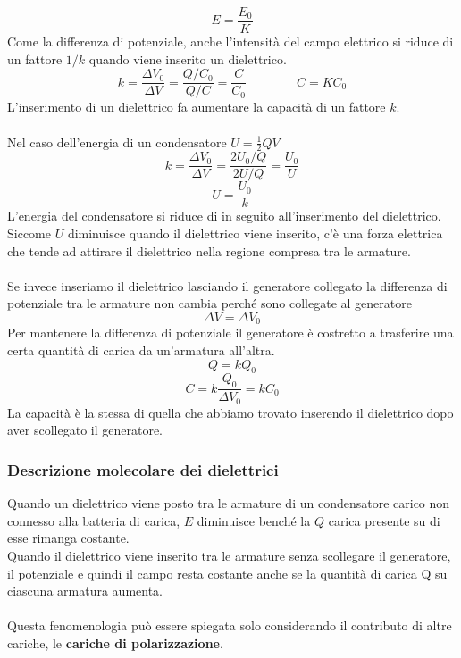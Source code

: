 \documentclass[../main.tex]{subfiles}
\begin{document}
	$$ E = \frac {E _ {0}}{K} $$
	Come la differenza di potenziale, anche l’intensità del campo elettrico si riduce di un fattore $1/k$ quando viene inserito un dielettrico.
	$$ k = \frac {\Delta V _ {0}}{\Delta V} = \frac {Q / C _ {0}}{Q / C} = \frac {C}{C _ {0}} \qquad\qquad C = K C _ {0} $$
	L’inserimento di un dielettrico fa aumentare la capacità di un fattore $k$.\\\\
	Nel caso dell’energia di un condensatore $U = \frac{1}{2} QV$
	$$ k = \frac{\Delta V_0}{\Delta V} = \frac{2 U_0 / Q}{2 U / Q} = \frac{U_0}{U} $$
	$$ U = \frac{U_0}{k} $$
	L’energia del condensatore si riduce di in seguito all’inserimento del dielettrico.\\
	Siccome $U$ diminuisce quando il dielettrico viene inserito, c’è una forza elettrica che tende ad attirare il dielettrico nella regione compresa tra le armature.\\\\
	Se invece inseriamo il dielettrico lasciando il generatore collegato la differenza di potenziale tra le armature non cambia perché sono collegate al generatore
	$$ \Delta V = \Delta V_0 $$
	Per mantenere la differenza di potenziale il generatore è costretto a trasferire una certa quantità di carica da un’armatura all’altra.
	$$ Q = k Q_0 $$
	$$ C = k \frac{Q_0}{\Delta V_0} = k C_0 $$
	La capacità è la stessa di quella che abbiamo trovato inserendo il dielettrico dopo aver scollegato il generatore.
	\subsubsection{Descrizione molecolare dei dielettrici}
	Quando un dielettrico viene posto tra le armature di un condensatore carico non connesso alla batteria di carica, $E$ diminuisce benché la $Q$ carica presente su di esse rimanga costante.\\
	Quando il dielettrico viene inserito tra le armature senza scollegare il generatore, il potenziale e quindi il campo resta costante anche se la quantità di carica Q su ciascuna armatura aumenta.\\\\
	Questa fenomenologia può essere spiegata solo considerando il contributo di altre cariche, le \textbf{cariche di polarizzazione}.
\end{document}
